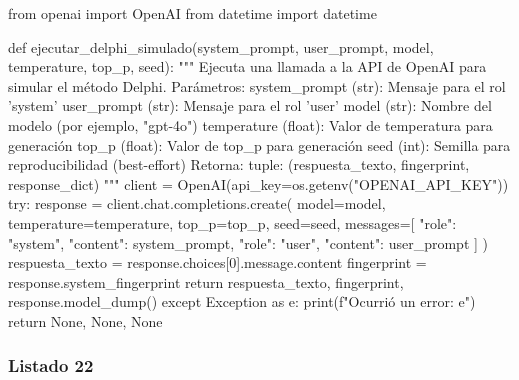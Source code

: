 \begin{APACode}
from openai import OpenAI
from datetime import datetime

def ejecutar_delphi_simulado(system_prompt, user_prompt, model, 
                             temperature, top_p, seed):
    """
    Ejecuta una llamada a la API de OpenAI para simular el método Delphi.
    Parámetros:
        system_prompt (str): Mensaje para el rol 'system'
        user_prompt (str): Mensaje para el rol 'user'
        model (str): Nombre del modelo (por ejemplo, "gpt-4o")
        temperature (float): Valor de temperatura para generación
        top_p (float): Valor de top_p para generación
        seed (int): Semilla para reproducibilidad (best-effort)
    Retorna:
        tuple: (respuesta_texto, fingerprint, response_dict)
    """
    client = OpenAI(api_key=os.getenv("OPENAI_API_KEY"))
    try:
        response = client.chat.completions.create(
            model=model,
            temperature=temperature,
            top_p=top_p,
            seed=seed,
            messages=[
                {"role": "system", "content": system_prompt},
                {"role": "user", "content": user_prompt}
            ]
        )
        respuesta_texto = response.choices[0].message.content
        fingerprint = response.system_fingerprint
        return respuesta_texto, fingerprint, response.model_dump()
    except Exception as e:
        print(f"Ocurrió un error: {e}")
        return None, None, None
\end{APACode}

\subsubsection{Listado 22}
\label{anexo:code-6-3-1-1-22}

